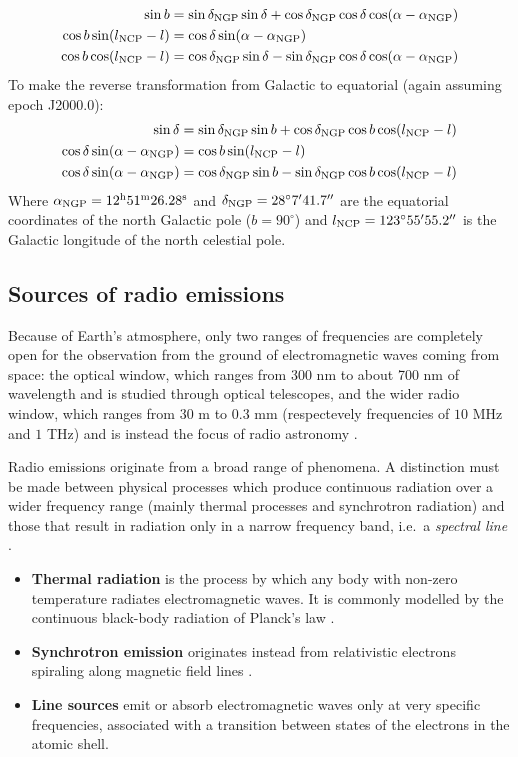 \begin{align}
    \sin b &= \sin \delta_{\text{NGP}} \sin \delta + \cos \delta_{\text{NGP}} \cos \delta \cos (\alpha - \alpha_{\text{NGP}}) \\
    \cos b \sin(l_{\text{NCP}} - l) &= \cos \delta \sin(\alpha - \alpha_{\text{NGP}}) \\
    \cos b \cos (l_{\text{NCP}} - l) &= \cos \delta_{\text{NGP}} \sin \delta - \sin \delta_{\text{NGP}} \cos \delta \cos(\alpha - \alpha_{\text{NGP}})
\end{align}
To make the reverse transformation from Galactic to equatorial (again assuming epoch J2000.0):
\begin{align}
    \sin \delta &= \sin \delta_{\text{NGP}} \sin b + \cos \delta_{\text{NGP}} \cos b \cos (l_{\text{NCP}} - l) \\
    \cos \delta \sin(\alpha - \alpha_{\text{NGP}}) &= \cos b \sin(l_{\text{NCP}} - l) \\
    \cos \delta \sin(\alpha - \alpha_{\text{NGP}}) &= \cos \delta_{\text{NGP}} \sin b - \sin \delta_{\text{NGP}} \cos b \cos (l_{\text{NCP}} - l)
\end{align}
Where $\alpha_{\text{NGP}} = 12^{\text{h}} 51^{\text{m}} 26.28^{\text{s}}$ and $\delta_{\text{NGP}} = 28^{\circ}7' 41.7''$ are the equatorial coordinates of the north Galactic pole ($b = 90^{\circ}$) and $l_{\text{NCP}} = 123^{\circ} 55' 55.2''$ is the Galactic longitude of the north celestial pole.

\subsection{Sources of radio emissions}
Because of Earth's atmosphere, only two ranges of frequencies are completely open for the observation from the ground of electromagnetic waves coming from space: the optical window, which ranges from 300 nm to about 700 nm of wavelength and is studied through optical telescopes, and the wider radio window, which ranges from $30$ m to $0.3$ mm (respectevely frequencies of $10$ MHz and $1$ THz) and is instead the focus of radio astronomy \cite{condon_essential_2016}.

Radio emissions originate from a broad range of phenomena.
A distinction must be made between physical processes which produce continuous radiation over a wider frequency range (mainly thermal processes and synchrotron radiation) and those that result in radiation only in a narrow frequency band, i.e.\ a \emph{spectral line} \cite{lauterbach_radio_2022}.
\begin{itemize}
    \item \textbf{Thermal radiation} is the process by which any body with non-zero temperature radiates electromagnetic waves. It is commonly modelled by the continuous black-body radiation of Planck's law \cite{carroll_introduction_2007}.
    \item \textbf{Synchrotron emission} originates instead from relativistic electrons spiraling along magnetic field lines \cite{maoz_astrophysics_2016}.
    \item \textbf{Line sources} emit or absorb electromagnetic waves only at very specific frequencies, associated with a transition between states of the electrons in the atomic shell.
\end{itemize}

